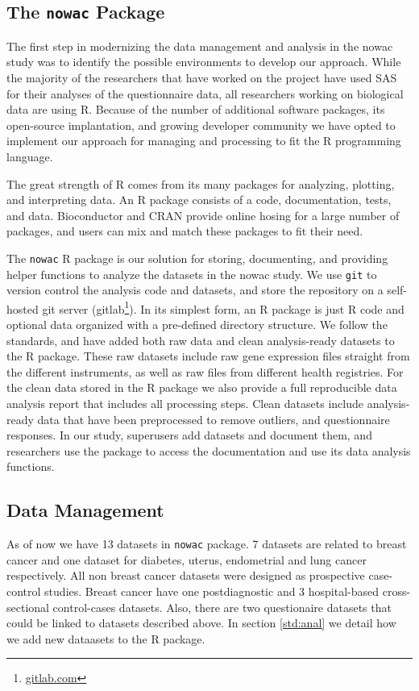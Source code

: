 \subsection{The \texttt{nowac} Package} 
The first step in modernizing the data management and analysis in the
\gls{nowac} study was to identify the possible environments to develop our
approach. While the majority of the researchers that have worked on the project
have used SAS for their analyses of the questionnaire data, all researchers
working on biological data are using R. Because of the number of additional
software  packages, its open-source implantation, and growing developer
community we have opted to implement our approach for managing and processing to
fit the R programming language. 

The great strength of R comes from its many packages for analyzing, plotting,
and interpreting data. An R package consists of a code, documentation, tests,
and data. Bioconductor and CRAN provide online hosing for a large number of
packages, and users can mix and match these packages to fit their need. 

The \texttt{nowac} R package is our solution for storing, documenting, and
providing helper functions to analyze the datasets in the \gls{nowac} study. We
use \texttt{git} to version control the analysis code and datasets, and store
the repository on a self-hosted git server (gitlab\footnote{\url{gitlab.com}}).
In its simplest form, an R package is just R code and optional data organized
with a pre-defined directory structure. We follow the standards, and have added
both raw data and clean analysis-ready datasets to the R package. These raw
datasets include raw gene expression files straight from the different
instruments, as well as raw files from different health registries. For the
clean data stored in the R package we also provide a full reproducible data
analysis report that includes all processing steps. Clean datasets include
analysis-ready data that have been preprocessed to remove outliers, and
questionnaire responses. In our study, superusers add datasets and document
them, and researchers use the package to access the documentation and use its
data analysis functions. 


\subsection{Data Management}
As of now we have 13 datasets in \texttt{nowac} package. 7 datasets are related
to breast cancer and one dataset for diabetes, uterus, endometrial and lung
cancer respectively. All non breast cancer datasets were designed as prospective
case-control studies.  Breast cancer have one postdiagnostic and 3
hospital-based cross-sectional control-cases datasets. Also, there are two
questionaire datasets that could be linked to datasets described above. In
section \ref{std:anal} we detail how we add new dataasets to the R package. 

